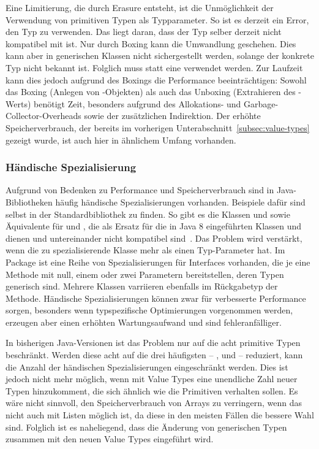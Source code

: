 Eine Limitierung, die durch Erasure entsteht, ist die Unmöglichkeit der Verwendung von primitiven Typen als Typparameter.
So ist es derzeit ein Error, den Typ  zu verwenden.
Das liegt daran, dass der Typ  selber derzeit nicht kompatibel mit  ist.
Nur durch Boxing kann die Umwandlung  geschehen.
Dies kann aber in generischen Klassen nicht sichergestellt werden, solange der konkrete Typ nicht bekannt ist.
Folglich muss statt  eine  verwendet werden.
Zur Laufzeit kann dies jedoch aufgrund des Boxings die Performance beeinträchtigen:
Sowohl das Boxing (Anlegen von -Objekten) als auch das Unboxing (Extrahieren des -Werts) benötigt Zeit, besonders aufgrund des Allokations- und Garbage-Collector-Overheads sowie der zusätzlichen Indirektion.
Der erhöhte Speicherverbrauch, der bereits im vorherigen Unterabschnitt~\ref{subsec:value-types} gezeigt wurde, ist auch hier in ähnlichem Umfang vorhanden.

\subsubsection{Händische Spezialisierung}

Aufgrund von Bedenken zu Performance und Speicherverbrauch sind in Java-Bibliotheken häufig händische Spezialisierungen vorhanden.
Beispiele dafür sind selbst in der Standardbibliothek zu finden.
So gibt es die Klassen  und  sowie Äquivalente für  und , die als Ersatz für die in Java 8 eingeführten Klassen  und  dienen und untereinander nicht kompatibel sind~\cite{java-8-docs}.
Das Problem wird verstärkt, wenn die zu spezialisierende Klasse mehr als einen Typ-Parameter hat.
Im Package  ist eine Reihe von Spezialisierungen für Interfaces vorhanden, die je eine Methode mit null, einem oder zwei Parametern bereitstellen, deren Typen generisch sind.
Mehrere Klassen varriieren ebenfalls im Rückgabetyp der Methode.
Händische Spezialisierungen können zwar für verbesserte Performance sorgen, besonders wenn typspezifische Optimierungen vorgenommen werden, erzeugen aber einen erhöhten Wartungsaufwand und sind fehleranfälliger.

In bisherigen Java-Versionen ist das Problem nur auf die acht primitive Typen beschränkt.
Werden diese acht auf die drei häufigsten -- ,  und  -- reduziert, kann die Anzahl der händischen Spezialisierungen eingeschränkt werden.
Dies ist jedoch nicht mehr möglich, wenn mit Value Types eine unendliche Zahl neuer Typen hinzukomment, die sich ähnlich wie die Primitiven verhalten sollen.
Es wäre nicht sinnvoll, den Speicherverbrauch von Arrays zu verringern, wenn das nicht auch mit Listen möglich ist, da diese in den meisten Fällen die bessere Wahl sind.
Folglich ist es naheliegend, dass die Änderung von generischen Typen zusammen mit den neuen Value Types eingeführt wird.

